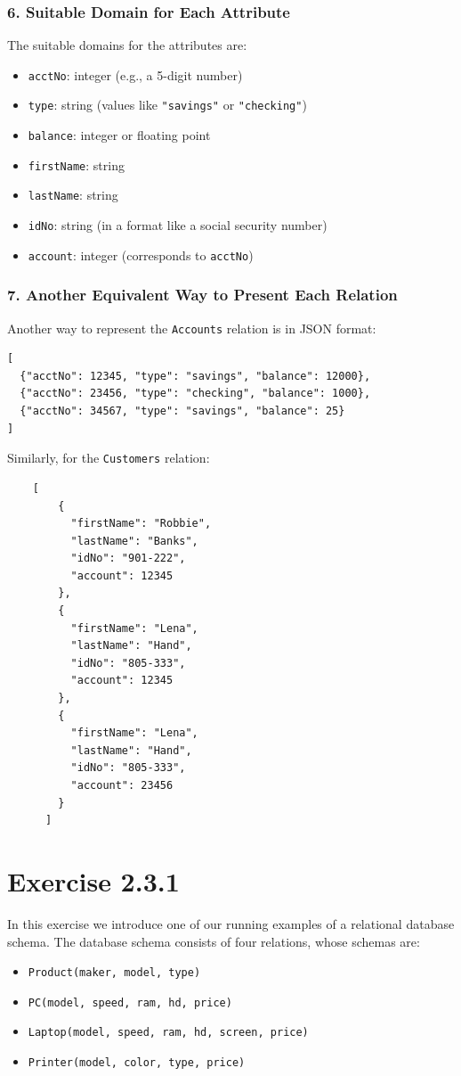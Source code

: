 \documentclass{cshwk}
\begin{document}
\subsubsection*{6. Suitable Domain for Each Attribute}
The suitable domains for the attributes are:
\begin{itemize}
    \item \texttt{acctNo}: integer (e.g., a 5-digit number)
    \item \texttt{type}: string (values like \texttt{"savings"} or \texttt{"checking"})
    \item \texttt{balance}: integer or floating point
    \item \texttt{firstName}: string
    \item \texttt{lastName}: string
    \item \texttt{idNo}: string (in a format like a social security number)
    \item \texttt{account}: integer (corresponds to \texttt{acctNo})
\end{itemize}

\subsubsection*{7. Another Equivalent Way to Present Each Relation}
Another way to represent the \texttt{Accounts} relation is in JSON format:
\begin{verbatim}
[
  {"acctNo": 12345, "type": "savings", "balance": 12000},
  {"acctNo": 23456, "type": "checking", "balance": 1000},
  {"acctNo": 34567, "type": "savings", "balance": 25}
]
\end{verbatim}

\noindent Similarly, for the \texttt{Customers} relation:
\begin{verbatim}
    [
        {
          "firstName": "Robbie",
          "lastName": "Banks",
          "idNo": "901-222",
          "account": 12345
        },
        {
          "firstName": "Lena",
          "lastName": "Hand",
          "idNo": "805-333",
          "account": 12345
        },
        {
          "firstName": "Lena",
          "lastName": "Hand",
          "idNo": "805-333",
          "account": 23456
        }
      ]
\end{verbatim}

\section{Exercise 2.3.1}
In this exercise we introduce one of our running examples of a relational database schema. The database schema consists of four relations, whose schemas are:
\begin{itemize}
    \item \texttt{Product(maker, model, type)}
    \item \texttt{PC(model, speed, ram, hd, price)}
    \item \texttt{Laptop(model, speed, ram, hd, screen, price)}
    \item \texttt{Printer(model, color, type, price)}
\end{itemize}
\end{document}

